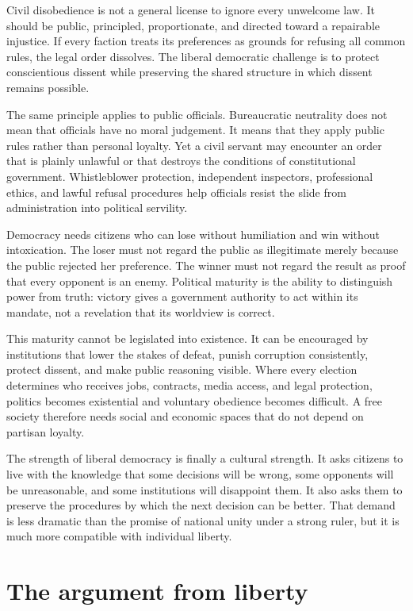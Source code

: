 ﻿\documentclass[12pt,a4paper]{book}
\begin{document}
Civil disobedience is not a general license to ignore every unwelcome law.
It should be public, principled, proportionate, and directed toward a
repairable injustice.  If every faction treats its preferences as grounds
for refusing all common rules, the legal order dissolves.  The liberal
democratic challenge is to protect conscientious dissent while preserving
the shared structure in which dissent remains possible.

The same principle applies to public officials.  Bureaucratic neutrality
does not mean that officials have no moral judgement.  It means that they
apply public rules rather than personal loyalty.  Yet a civil servant may
encounter an order that is plainly unlawful or that destroys the conditions
of constitutional government.  Whistleblower protection, independent
inspectors, professional ethics, and lawful refusal procedures help officials
resist the slide from administration into political servility.

Democracy needs citizens who can lose without humiliation and win without
intoxication.  The loser must not regard the public as illegitimate merely
because the public rejected her preference.  The winner must not regard the
result as proof that every opponent is an enemy.  Political maturity is the
ability to distinguish power from truth: victory gives a government authority
to act within its mandate, not a revelation that its worldview is correct.

This maturity cannot be legislated into existence.  It can be encouraged by
institutions that lower the stakes of defeat, punish corruption consistently,
protect dissent, and make public reasoning visible.  Where every election
determines who receives jobs, contracts, media access, and legal protection,
politics becomes existential and voluntary obedience becomes difficult.  A
free society therefore needs social and economic spaces that do not depend
on partisan loyalty.

The strength of liberal democracy is finally a cultural strength.  It asks
citizens to live with the knowledge that some decisions will be wrong, some
opponents will be unreasonable, and some institutions will disappoint them.
It also asks them to preserve the procedures by which the next decision can
be better.  That demand is less dramatic than the promise of national unity
under a strong ruler, but it is much more compatible with individual liberty.

\section{The argument from liberty}
\end{document}
